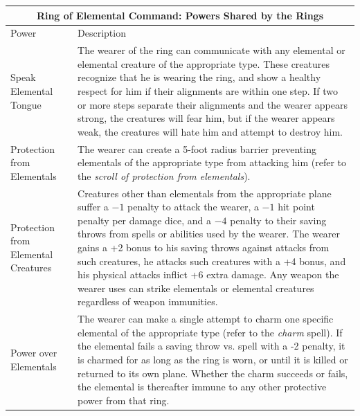\noindent
\begin{tabular}{|p{}|p{}|}
\multicolumn{2}{c}{Ring of Elemental Command: Powers Shared by the Rings} \\
\hline
Power	& Description \\
\hline\hline
\rowcolor[gray]{.9}Speak Elemental Tongue	& The wearer of the ring can communicate with any elemental or elemental creature of the appropriate type.  These creatures recognize that he is wearing the ring, and show a healthy respect for him if their alignments are within one step.  If two or more steps separate their alignments and the wearer appears strong, the creatures will fear him, but if the wearer appears weak, the creatures will hate him and attempt to destroy him. \\
Protection from Elementals	& The wearer can create a 5-foot radius barrier preventing elementals of the appropriate type from attacking him (refer to the \textit{scroll of protection from elementals}). \\
\rowcolor[gray]{.9}Protection from Elemental Creatures	& Creatures other than elementals from the appropriate plane suffer a $-1$ penalty to attack the wearer, a $-1$ hit point penalty per damage dice, and a $-4$ penalty to their saving throws from spells or abilities used by the wearer.  The wearer gains a +2 bonus to his saving throws against attacks from such creatures, he attacks such creatures with a +4 bonus, and his physical attacks inflict +6 extra damage.  Any weapon the wearer uses can strike elementals or elemental creatures regardless of weapon immunities. \\
Power over Elementals	& The wearer can make a single attempt to charm one specific elemental of the appropriate type (refer to the \textit{charm} spell).  If the elemental fails a saving throw vs. spell with a -2 penalty, it is charmed for as long as the ring is worn, or until it is killed or returned to its own plane.  Whether the charm succeeds or fails, the elemental is thereafter immune to any other protective power from that ring. \\
\hline
\end{tabular}

